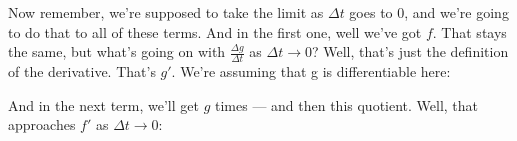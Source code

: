 \documentclass[pdftex, brazil, 12pt, twoside]{article}
\begin{document}
\begin{figure}[H]
  \begin{center}
  \end{center}
\end{figure}

Now remember, we're supposed to take the limit as $\Delta t$ goes
to 0, and we're going to do that to all of these terms.
And in the first one, well we've got $f$.
That stays the same, but what's going on
with $\displaystyle \frac{\Delta g}{\Delta t}$ as $\Delta t \to 0$?
Well, that's just the definition of the derivative.
That's $g'$.
We're assuming that g is differentiable here:

\begin{figure}[H]
  \begin{center}
  \end{center}
\end{figure}

And in the next term, we'll get $g$ times --- and then
this quotient. Well, that approaches $f'$ as $\Delta t \to 0$:
\end{document}
